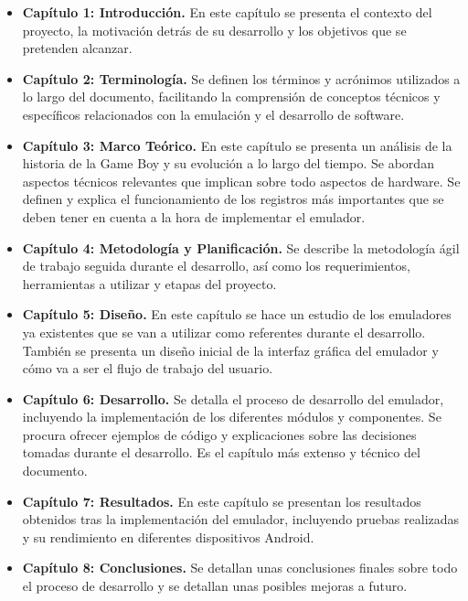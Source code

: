 \begin{itemize}
    \item \textbf{Capítulo 1: Introducción.} En este capítulo se presenta el contexto del proyecto, la motivación detrás de su desarrollo y los objetivos que se pretenden alcanzar.
    \item \textbf{Capítulo 2: Terminología.} Se definen los términos y acrónimos utilizados a lo largo del documento, facilitando la comprensión de conceptos técnicos y específicos relacionados con la emulación y el desarrollo de software.
    \item \textbf{Capítulo 3: Marco Teórico.} En este capítulo se presenta un análisis de la historia de la Game Boy y su evolución a lo largo del tiempo. Se abordan aspectos técnicos relevantes que implican sobre todo aspectos de hardware. Se definen y explica el funcionamiento de los registros más importantes que se deben tener en cuenta a la hora de implementar el emulador.
    \item \textbf{Capítulo 4: Metodología y Planificación.} Se describe la metodología ágil de trabajo seguida durante el desarrollo, así como los requerimientos, herramientas a utilizar y etapas del proyecto.
    \item \textbf{Capítulo 5: Diseño.} En este capítulo se hace un estudio de los emuladores ya existentes que se van a utilizar como referentes durante el desarrollo. También se presenta un diseño inicial de la interfaz gráfica del emulador y cómo va a ser el flujo de trabajo del usuario.
    \item \textbf{Capítulo 6: Desarrollo.} Se detalla el proceso de desarrollo del emulador, incluyendo la implementación de los diferentes módulos y componentes. Se procura ofrecer ejemplos de código y explicaciones sobre las decisiones tomadas durante el desarrollo. Es el capítulo más extenso y técnico del documento.
    \item \textbf{Capítulo 7: Resultados.} En este capítulo se presentan los resultados obtenidos tras la implementación del emulador, incluyendo pruebas realizadas y su rendimiento en diferentes dispositivos Android.
    \item \textbf{Capítulo 8: Conclusiones.} Se detallan unas conclusiones finales sobre todo el proceso de desarrollo y se detallan unas posibles mejoras a futuro.
\end{itemize}

\cleardoublepage

